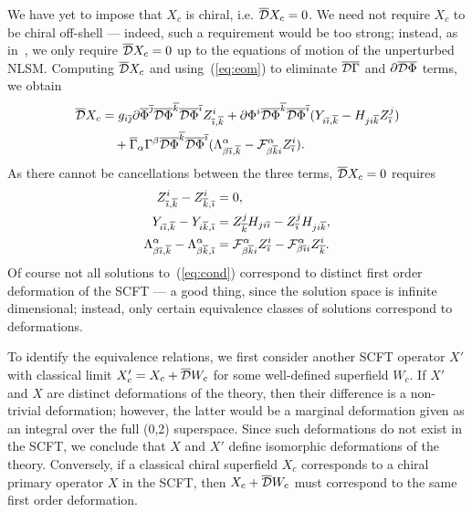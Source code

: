 \documentclass[11pt, a4paper]{article}
\def\cDb{{\overline{\cD}}}
\def\p{\partial}
\def\cD{{\cal D}}
\def\cF{{\cal F}}
\newcommand\Gammab{\overline{\Gamma}}
\newcommand\Phib{\overline{\Phi}}
\newcommand\ib{\overline{\imath}}
\newcommand\jb{\overline{\jmath}}
\newcommand\kb{\overline{k}}
\def\cDb{\overline{\cD}}
\begin{document}
We have yet to impose that $X_c$ is chiral, i.e. $\cDb  X_c = 0$.  We need not require
$X_c$ to be chiral off-shell --- indeed, such a requirement would be too strong; instead,
as in~\cite{Beasley:2004ys,Beasley:2005iu}, we only require $\cDb X_c = 0$
up to the equations of motion of the unperturbed NLSM.  Computing $\cDb X_c$ and
using~(\ref{eq:eom}) to eliminate $\cDb \Gammab$ and $\p \cDb \Phib$ terms, we
obtain
\begin{align*}
\cDb X_c & = g_{i\jb } \p\Phib^{\jb} \cDb \Phib^{\kb} \cDb\Phib^{\ib} Z^i_{\ib,\kb}
+ \p\Phi^i\cDb\Phib^{\kb} \cDb\Phib^{\ib} ( Y_{i\ib,\kb} - H_{ji\kb} Z^j_{\ib} ) \nonumber\\
&\quad+ \Gammab_\alpha \Gamma^\beta \cDb\Phib^{\kb} \cDb\Phib^{\ib} 
(\Lambda^\alpha_{\beta \ib,\kb} - \cF^\alpha_{\beta \kb i} Z^i_{\ib} ).
\end{align*}
As there cannot be cancellations between the three terms, 
$\cDb X_c = 0$ requires
\begin{align}
\label{eq:cond}
Z^i_{\ib,\kb} - Z^i_{\kb,\ib} & = 0, \nonumber\\
Y_{i\ib,\kb} -Y_{i\kb,\ib} &= Z^j_{\kb} H_{ji\ib} - Z^j_{\ib} H_{ji\kb}, \\
\Lambda^\alpha_{\beta\ib,\kb}-\Lambda^\alpha_{\beta\kb,\ib} &= \cF^\alpha_{\beta\kb i} Z^i_{\ib} - \cF^\alpha_{\beta\ib i} Z^i_{\kb}. \nonumber
\end{align}
Of course not all solutions to~(\ref{eq:cond}) correspond to distinct first order deformation
of the SCFT --- a good thing, since the solution space is infinite dimensional; instead,
only certain equivalence classes of solutions correspond to deformations.  

To identify
the equivalence relations, we first consider another SCFT operator $X'$ with classical
limit $X'_c = X_c + \cDb W_c$ for some well-defined superfield $W_c$.  If
$X'$ and $X$ are distinct deformations of the theory, then their difference is a non-trivial deformation;  however, the latter would be a marginal deformation given as an integral 
over the full (0,2) superspace.  Since such deformations do not exist in the SCFT, we conclude
that $X$ and $X'$ define isomorphic deformations of the theory.  Conversely, if a
classical chiral superfield $X_c$ corresponds to a chiral primary operator $X$ in
the SCFT, then $X_c + \cDb W_c$ must correspond to the same first order deformation.
\end{document}

